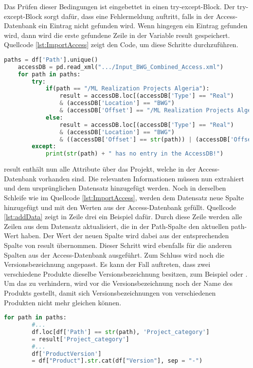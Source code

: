Das Prüfen dieser Bedingungen ist eingebettet in einen try-except-Block. Der try-except-Block sorgt dafür, dass eine Fehlermeldung auftritt, falls in der Access-Datenbank ein Eintrag nicht gefunden wird.
Wenn hingegen ein Eintrag gefunden wird, dann wird die erste gefundene Zeile in der Variable \glqq result\grqq{} gespeichert. Quellcode \ref*{lst:ImportAccess} zeigt den Code, um diese Schritte durchzuführen.
\begin{lstlisting}[language = python, caption={Importieren der Access-Datenbank},captionpos=b, label = lst:ImportAccess, floatplacement=H]
    paths = df['Path'].unique()
    accessDB = pd.read_xml(".../Input_BWG_Combined_Access.xml")
    for path in paths:
        try:
            if(path == "/ML Realization Projects Algeria"):
                result = accessDB.loc[(accessDB['Type'] == "Real") 
                & (accessDB['Location'] == "BWG") 
                & (accessDB['Offset'] == "/ML Realization Projects Algeria/20006_ML_BM_Boughezoul_MSila")].iloc[0]
            else:
                result = accessDB.loc[(accessDB['Type'] == "Real") 
                & (accessDB['Location'] == "BWG") 
                & ((accessDB['Offset'] == str(path)) | (accessDB['Offset'] == (str(path) + "/")))].iloc[0]           
        except:
            print(str(path) + " has no entry in the AccessDB!")
\end{lstlisting}
\glqq result\grqq{} enthält nun alle Attribute über das Projekt, welche in der Access-Datenbank vorhanden sind. Die relevanten Informationen müssen nun extrahiert und dem ursprünglichen 
Datensatz hinzugefügt werden. Noch in derselben Schleife wie im Quellcode \ref*{lst:ImportAccess}, werden dem Datensatz neue Spalte hinzugefügt und mit den Werten aus der 
Access-Datenbank gefüllt. Quellcode \ref*{lst:addData} zeigt in Zeile drei ein Beispiel dafür. Durch diese Zeile werden alle Zeilen aus dem Datensatz aktualisiert, 
die in der \glqq Path\grqq{}-Spalte den aktuellen \glqq path\grqq{}-Wert haben. Der Wert der neuen Spalte wird dabei aus der entsprechenden Spalte von \glqq result\grqq{} übernommen.
Dieser Schritt wird ebenfalls für die anderen Spalten aus der Access-Datenbank ausgeführt. Zum Schluss wird noch die Versionsbezeichnung angepasst. 
Es kann der Fall auftreten, dass zwei verschiedene Produkte dieselbe Versionsbezeichnung besitzen, zum Beispiel \grqq{} oder \grqq{}. Um das zu verhindern,
wird vor die Versionsbezeichnung noch der Name des Produkts gestellt, damit sich Versionsbezeichnungen von verschiedenen Produkten nicht mehr gleichen können.
\begin{lstlisting}[language = python, caption={Erweiterung des Datensatzes},captionpos=b, label = lst:addData, floatplacement=H]
    for path in paths:
        #...
        df.loc[df['Path'] == str(path), 'Project_category']
        = result['Project_category']
        #...
        df['ProductVersion'] 
        = df["Product"].str.cat(df["Version"], sep = "-")
\end{lstlisting}
